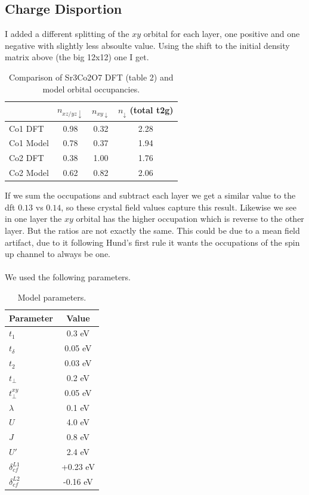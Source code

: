 \documentclass[11pt]{article}
\begin{document}
\subsection{Charge Disportion}
I added a different splitting of the $xy$ orbital for each layer, one positive and one negative
with slightly less absoulte value. Using the shift to the initial density matrix above (the big 12x12) one
I get.
\begin{table}[h]
\centering
\begin{tabular}{lccc}
\hline
 & $n_{xz/yz\downarrow}$ & $n_{xy\downarrow}$ & $n_{\downarrow}$ (total t2g) \\
\hline
Co1 DFT   & 0.98 & 0.32 & 2.28 \\
Co1 Model & 0.78 & 0.37 & 1.94 \\
Co2 DFT   & 0.38 & 1.00 & 1.76 \\
Co2 Model & 0.62 & 0.82 & 2.06 \\
\hline
\end{tabular}
\caption{Comparison of Sr3Co2O7 DFT (table 2) and model orbital occupancies.}
\label{tab:comparison}
\end{table}
If we sum the occupations and subtract each layer we get a similar value to the dft $0.13$ vs $0.14$,
so these crystal field values capture this result. Likewise we see in one layer the $xy$
orbital has the higher occupation which is reverse to the other layer. But the ratios are not exactly the same.
This could be due to a mean field artifact, due to it following Hund's first rule it wants the occupations
of the spin up channel to always be one. 
\\\\
We used the following parameters.
\begin{table}[h]
\centering
\begin{tabular}{lc}
\hline
Parameter & Value \\
\hline
$t_1$              & 0.3 eV   \\
$t_\delta$         & 0.05 eV  \\
$t_2$              & 0.03 eV  \\
$t_\perp$          & 0.2 eV   \\
$t_\perp^{xy}$     & 0.05 eV  \\
$\lambda$          & 0.1 eV   \\
$U$                & 4.0 eV   \\
$J$                & 0.8 eV   \\
$U'$               & 2.4 eV   \\
$\delta_{cf}^{L1}$ & +0.23 eV \\
$\delta_{cf}^{L2}$ & -0.16 eV \\
\hline
\end{tabular}
\caption{Model parameters.}
\label{tab:parameters}
\end{table}
\end{document}
